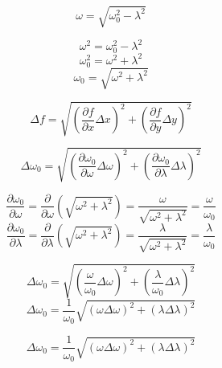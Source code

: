 \documentclass[preview]{standalone}
\begin{document}
\[
\omega = \sqrt{\omega_0^2 - \lambda^2}
\]

\[
	\omega^2 = \omega_0^2 - \lambda^2
\]
\[
\omega_0^2 = \omega^2 + \lambda^2
\]
\[
\omega_0 = \sqrt{\omega^2 + \lambda^2}
\]

\[
\Delta f = \sqrt{\left(\frac{\partial f}{\partial x} \Delta x\right)^2 + \left(\frac{\partial f}{\partial y} \Delta y\right)^2}
\]

\[
\Delta \omega_0 = \sqrt{\left(\frac{\partial \omega_0}{\partial \omega} \Delta \omega\right)^2 + \left(\frac{\partial \omega_0}{\partial \lambda} \Delta \lambda\right)^2}
\]

\[
\frac{\partial \omega_0}{\partial \omega} = \frac{\partial}{\partial \omega} \left( \sqrt{\omega^2 + \lambda^2} \right) = \frac{\omega}{\sqrt{\omega^2 + \lambda^2}} = \frac{\omega}{\omega_0}
\]
\[
\frac{\partial \omega_0}{\partial \lambda} = \frac{\partial}{\partial \lambda} \left( \sqrt{\omega^2 + \lambda^2} \right) = \frac{\lambda}{\sqrt{\omega^2 + \lambda^2}} = \frac{\lambda}{\omega_0}
\]

\[
\Delta \omega_0 = \sqrt{\left(\frac{\omega}{\omega_0} \Delta \omega\right)^2 + \left(\frac{\lambda}{\omega_0} \Delta \lambda\right)^2}
\]
\[
\Delta \omega_0 = \frac{1}{\omega_0} \sqrt{(\omega \Delta \omega)^2 + (\lambda \Delta \lambda)^2}
\]

\[
\boxed{
\Delta \omega_0 = \frac{1}{\omega_0} \sqrt{(\omega \Delta \omega)^2 + (\lambda \Delta \lambda)^2}
}
\]
\end{document}
